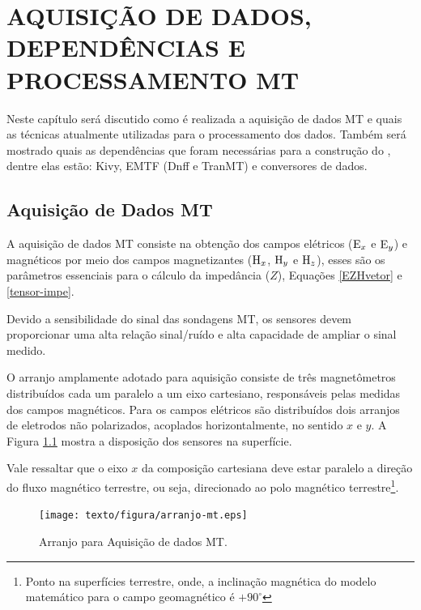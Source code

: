 \chapter{AQUISIÇÃO DE DADOS, DEPENDÊNCIAS E PROCESSAMENTO MT}
    
    Neste capítulo será discutido como é realizada a aquisição de dados MT e quais as técnicas atualmente utilizadas para o processamento dos dados. Também será mostrado quais as dependências que foram necessárias para a construção do \software, dentre elas estão: Kivy, EMTF (Dnff e TranMT) e conversores de dados.
        
    \section{Aquisição de Dados MT}        
    
        A aquisição de dados MT consiste na obtenção dos campos elétricos ($\textrm{E}_x$ e $\textrm{E}_y$) e magnéticos por meio dos campos magnetizantes ($\textrm{H}_x$, $\textrm{H}_y$ e $\textrm{H}_z$), esses são os parâmetros essenciais para o cálculo da impedância ($Z$), Equações \ref{EZHvetor} e \ref{tensor-impe}.
        
        Devido a sensibilidade do sinal das sondagens MT, os sensores devem proporcionar uma alta relação sinal/ruído e alta capacidade de ampliar o sinal medido.
        
        O arranjo amplamente adotado para aquisição consiste de três magnetômetros distribuídos cada um paralelo a um eixo cartesiano, responsáveis pelas medidas dos campos magnéticos. Para os campos elétricos são distribuídos dois arranjos de eletrodos não polarizados, acoplados horizontalmente, no sentido $x$ e $y$. A Figura \ref{fig-arranjo-mt} mostra a disposição dos sensores na superfície.
        
        Vale ressaltar que o eixo $x$ da composição cartesiana deve estar paralelo a direção do fluxo magnético terrestre, ou seja, direcionado ao polo magnético terrestre\footnote{Ponto na superfícies terrestre, onde, a inclinação magnética do modelo matemático para o campo geomagnético é $+90^\circ$}. 
        
        \begin{figure}[H]
            \caption{Arranjo para Aquisição de dados MT.}
                \begin{center}
                    \texttt{[image: texto/figura/arranjo-mt.eps]}
                \end{center}
            \label{fig-arranjo-mt}
        \end{figure}
        
